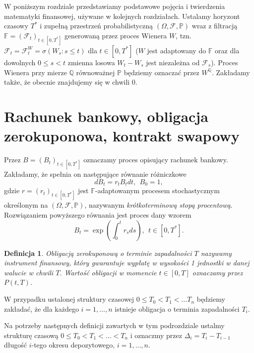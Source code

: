 \documentclass{mini}
\theoremstyle{mythstyle}
\newtheorem{Definicja}{Definicja}[chapter]
\begin{document}
	W poniższym rozdziale przedstawiamy podstawowe pojęcia i twierdzenia matematyki finansowej, używane w kolejnych rozdziałach. Ustalamy horyzont czasowy $T^*$ i zupełną przestrzeń probabilistyczną $(\Omega, \mathcal{F}, \mathbb{P})$ wraz z filtracją $\mathbb{F} = (\mathcal{F}_t)_{t\in [0,T^*]}$ generowaną przez proces Wienera $W$, tzn. $\mathcal{F}_t=\mathcal{F}_t^W=\sigma(W_s:s\leq t)$ dla $t \in [0,T^*]$ ($W$ jest adaptowany do $\mathbb{F}$ oraz dla dowolnych $0 \leq s < t $ zmienna losowa $W_t-W_s$ jest niezależna od $\mathcal{F}_s$). Proces Wienera przy mierze $\mathbb{Q}$ równoważnej $\mathbb{P}$ będziemy oznaczać przez $W^\mathbb{Q}$. Zakładamy także, że obecnie znajdujemy się w chwili 0.

\section{Rachunek bankowy, obligacja zerokuponowa, kontrakt swapowy}
	Przez $B=(B_t)_{t\in [0,T^*]}$ oznaczamy proces opisujący rachunek bankowy. Zakładamy, że spełnia on następujące równanie różniczkowe
	\[ dB_t = r_t B_t dt, \ \ B_0=1, \]
	gdzie $r=(r_t)_{t\in [0,T^*]}$ jest $\mathbb{F}$-adaptowanym procesem stochastycznym określonym na $(\Omega, \mathcal{F},\mathbb{P})$, nazywanym \textit{krótkoterminową stopą procentową}.
	Rozwiązaniem powyższego równania jest proces dany wzorem
	\[ B_t = \exp\left(\int_0^t r_s ds\right), \ \ t\in [0,T^*]. \]

\begin{Definicja}
	Obligacją zerokuponową o terminie zapadalności $T$ nazywamy instrument finansowy, który gwarantuje wypłatę w wysokości 1 jednostki w danej walucie w chwili $T$. Wartość obligacji w momencie $t\in [0,T]$ oznaczamy przez $P(t,T)$.
\end{Definicja}
	W przypadku ustalonej struktury czasowej $0 \leq T_0 < T_1 <\ldots T_n$ będziemy zakładać, że dla każdego $i=1,\ldots,n$ istnieje obligacja o terminia zapadalności $T_i$.

	Na potrzeby następnych definicji zawartych w tym podrozdziale ustalmy strukturę czasową $0\leq T_0<T_1< \ldots < T_n$ i
	oznaczmy przez $\Delta_i = T_i-T_{i-1}$ długość $i$-tego okresu depozytowego, $i=1,\ldots,n$.\\
\end{document}
